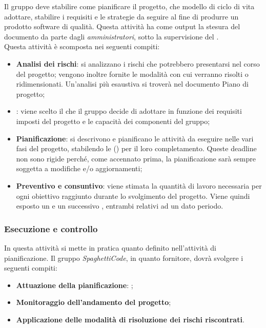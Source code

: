 Il gruppo deve stabilire come pianificare il progetto, che modello di ciclo di vita adottare, stabilire i requisiti e le strategie da
seguire al fine di produrre un prodotto software di qualità. Questa attività ha come output la stesura del documento
\emph{} da parte dagli \emph{amministratori}, sotto la supervisione del \emph{}.\\
Questa attività è scomposta nei seguenti compiti:
\begin{itemize}
    \item \textbf{Analisi dei rischi}: si analizzano i rischi che potrebbero presentarsi nel corso del progetto; vengono inoltre fornite le
    modalità con cui verranno risolti o ridimensionati. Un'analisi più esaustiva si troverà nel documento Piano di progetto;
    \item \textbf{}: viene scelto il  che il gruppo decide di adottare in
    funzione dei requisiti imposti del progetto e le capacità dei componenti del gruppo;
    \item \textbf{Pianificazione}: si descrivono e pianificano le attività da eseguire nelle vari fasi del progetto,
    stabilendo le () per il loro completamento. Queste deadline non sono rigide perché, come accennato prima, la
    pianificazione sarà sempre soggetta a modifiche e/o aggiornamenti;
    \item \textbf{Preventivo e consuntivo}: viene stimata la quantità di lavoro necessaria per ogni obiettivo raggiunto durante lo
    svolgimento del progetto. Viene quindi esposto un  e un successivo , entrambi relativi ad un
    dato periodo.
\end{itemize}

\subsubsection{Esecuzione e controllo}
\label{par:esecuzione_e_controllo}

In questa attività si mette in pratica quanto definito nell'attività di pianificazione. Il gruppo \emph{SpaghettiCode}, in quanto fornitore,
dovrà svolgere i seguenti compiti:
\begin{itemize}
    \item \textbf{Attuazione della pianificazione}: ;
    \item \textbf{Monitoraggio dell'andamento del progetto};
    \item \textbf{Applicazione delle modalità di risoluzione dei rischi riscontrati}.
\end{itemize}

